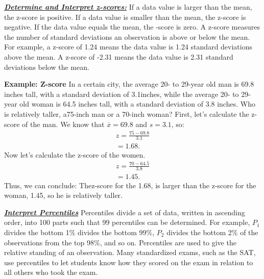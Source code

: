 \documentclass{report}
\begin{document}
         \pagebreak \bigbreak \noindent
         \textbf{\textit{\underline{Determine and Interpret z-scores:}}}
         \bigbreak \noindent 
       If a data value is larger than the mean, the z-score is positive. If a data value is smaller than the mean, the z-score is negative. If the data value equals the mean, the -score is zero. A z-score measures the number of standard deviations an observation is above or below the mean. For example, a  z-score of 1.24 means the data value is 1.24  standard deviations above the mean. A z-score of -2.31  means the data value is 2.31 standard deviations below the mean.
       \bigbreak \noindent 
          \begin{mdframed}
           \textbf{Example: Z-score}
           \bigbreak \noindent 
              In a certain city, the average​ 20- to 29-year old man is 69.8  inches​ tall, with a standard deviation of 3.1  ​inches, while the average​ 20- to​ 29-year old woman is 64.5  inches​ tall, with a standard deviation of 3.8  inches. Who is relatively​ taller, a​ 75-inch man or a​ 70-inch woman?
              \bigbreak \noindent 
                First, let's calculate the z-score of the man. We know that $\overline{x} = 69.8$ and $s = 3.1$, so:
                \begin{align*}
                    z = \frac{75-69.8}{3.1} \\
                    =1.68
                .\end{align*}
                \bigbreak \noindent 
                Now let's calculate the z-score of the women.
                \begin{align*}
                    z = \frac{70-64.5}{3.8} \\
                    =1.45
                .\end{align*}
                \bigbreak \noindent 
                Thus, we can conclude:
                The​ z-score for the 1.68​, is larger than the​ z-score for the woman, 1.45, so he  is relatively taller.
         \end{mdframed}

         \bigbreak \noindent \bigbreak \noindent 
         \textbf{\textit{\underline{Interpret Percentiles}}}
         \bigbreak \noindent 
         Percentiles divide a set of data, written in ascending order, into 100 parts such that 99  percentiles can be determined. For example, $P_{1}$  divides the bottom 1\%  divides the bottom 99\%, $P_{2} $  divides the bottom 2\%  of the observations from the top 98\%, and so on.
         \bigbreak \noindent 
         Percentiles are used to give the relative standing of an observation. Many standardized exams, such as the SAT, use percentiles to let students know how they scored on the exam in relation to all others who took the exam.
\end{document}
